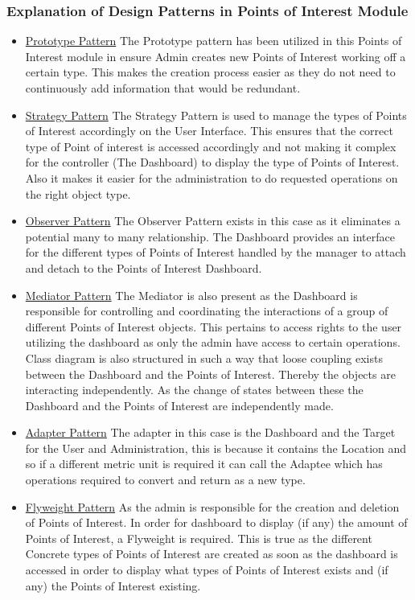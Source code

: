 \documentclass[runningheads,a4paper]{article}
\begin{document}
\subsubsection {Explanation of Design Patterns in Points of Interest Module}
\begin{itemize}
\item \underline{Prototype Pattern} The Prototype pattern has been utilized in this Points of Interest module in ensure Admin creates new Points of Interest working off a certain type.  This makes the creation process easier as they do not need to continuously add information that would be redundant. 

\item \underline{Strategy Pattern} The Strategy Pattern is used to manage the types of Points of Interest accordingly on the User Interface. This ensures that the correct type of Point of interest is accessed accordingly and not making it complex for the controller (The Dashboard) to display the type of Points of Interest. Also it makes it easier for the administration to do requested operations on the right object type.

\item \underline{Observer Pattern} The Observer Pattern exists in this case as it eliminates a potential many to many relationship. The Dashboard provides an interface for the different types of Points of Interest handled by the manager to attach and detach to the Points of Interest Dashboard.

\item \underline{Mediator Pattern} The Mediator is also present as the Dashboard is responsible for controlling and coordinating the interactions of a group of different Points of Interest objects. This pertains to access rights to the user utilizing the dashboard as only the admin have access to certain operations. Class diagram is also structured in such a way that loose coupling exists between the Dashboard and the Points of Interest. Thereby the objects are interacting independently. As the change of states between these the Dashboard and the Points of Interest are independently made. 

\item \underline{Adapter Pattern} The adapter in this case is the Dashboard and the Target for the User and Administration, this is because it contains the Location and so if a different metric unit is required it can call the Adaptee which has operations required to convert and return as a new type.

\item \underline{Flyweight Pattern} As the admin is responsible for the creation and deletion of Points of Interest. In order for dashboard to display (if any) the amount of Points of Interest, a Flyweight is required. This is true as the different Concrete types of Points of Interest are created as soon as the dashboard is accessed  in order to display what types of Points of Interest exists and (if any) the Points of Interest existing.

\end{itemize}
\end{document}
